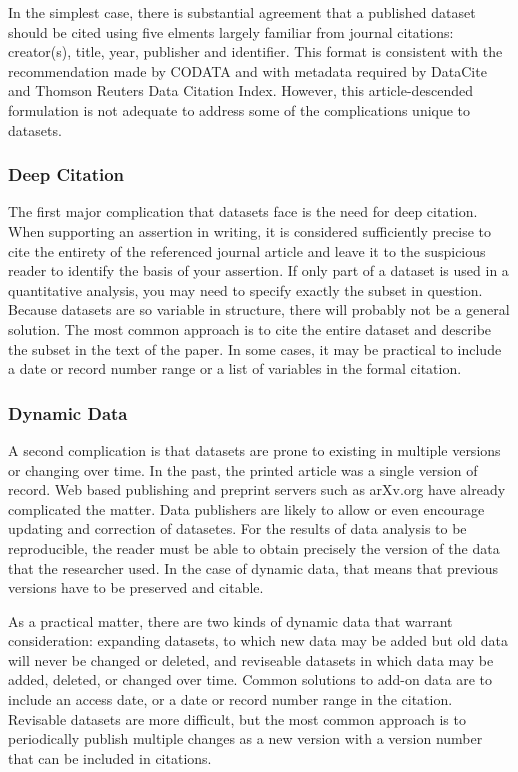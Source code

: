 \documentclass[10pt,a4paper,twocolumn]{article}
\begin{document}
In the simplest case, there is substantial agreement that a published dataset should be cited using five elments largely familiar from journal citations: creator(s), title, year, publisher and identifier. 
This format is consistent with the recommendation made by CODATA\cite{socha_out_2013} and with metadata required by DataCite \cite{datacite_datacite_2013} and Thomson Reuters Data Citation Index. However, this article-descended formulation is not adequate to address some of the complications unique to datasets.

\subsubsection{Deep Citation}\label{deep-citation}

The first major complication that datasets face is the need for deep citation. 
When supporting an assertion in writing, it is considered sufficiently precise to cite the entirety of the referenced journal article and leave it to the suspicious reader to identify the basis of your assertion. 
If only part of a dataset is used in a quantitative analysis, you may need to specify exactly the subset in question. 
Because datasets are so variable in structure, there will probably not be a general solution. 
The most common approach is to cite the entire dataset and describe the subset in the text of the paper. 
In some cases, it may be practical to include a date or record number range or a list of variables in the formal citation.

\subsubsection{Dynamic Data}\label{dynamic-data}

A second complication is that datasets are prone to existing in multiple versions or changing over time. 
In the past, the printed article was a single version of record.
Web based publishing and preprint servers such as arXv.org have already complicated the matter. 
Data publishers are likely to allow or even encourage updating and correction of datasetes. 
For the results of data analysis to be reproducible, the reader must be able to obtain precisely the version of the data that the researcher used. 
In the case of dynamic data, that means that previous versions have to be preserved and citable.

As a practical matter, there are two kinds of dynamic data that warrant consideration: expanding datasets, to which new data may be added but old data will never be changed or deleted, and reviseable datasets in which data may be added, deleted, or changed over time. 
Common solutions to add-on data are to include an access date, or a date or record number range in the citation. 
Revisable datasets are more difficult, but the most common approach is to periodically publish multiple changes as a new version with a version number that can be included in citations.
\end{document}

